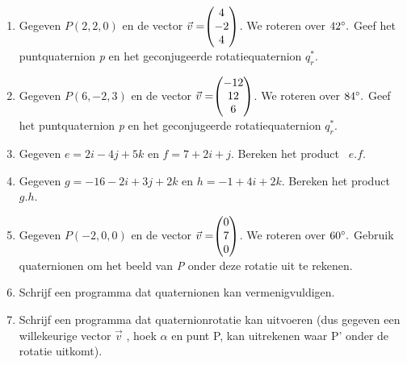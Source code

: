 \begin{enumerate}
	\item Gegeven $ P (2,2,0) $ en de vector $\vec{v} = \vecdrie{4}{-2}{4} $. 
	We roteren over $ 42\degree. $ Geef het puntquaternion \textit{p} en het geconjugeerde rotatiequaternion  $  q_r^* $. 
	
	\item Gegeven $ P (6,-2,3) $ en de vector $\vec{v} = \vecdrie{-12}{12}{6} $. 
	We roteren over $ 84\degree. $ Geef het puntquaternion \textit{p} en het geconjugeerde rotatiequaternion  $  q_r^* $. 
	
	\item Gegeven $ e = 2i-4j+5k$ en   $ f = 7+2i+j $. 
	Bereken het product \ $  e.f $.
	
	\item Gegeven $ g = -16 -2i+3j+2k $ en   $ h = -1+4i+2k $. 
	Bereken het product \ $  g.h $.
	
	\item  Gegeven $ P (-2, 0, 0) $ en de vector $\vec{v} = \vecdrie{0}{7}{0} $. 
	We roteren over $ 60\degree. $ Gebruik quaternionen om het beeld van \textit{P }onder deze rotatie uit te rekenen.   
	
	\item Schrijf een programma dat quaternionen kan vermenigvuldigen.   
	
	\item Schrijf een programma dat quaternionrotatie kan uitvoeren (dus gegeven een willekeurige vector $\vec{v} $ , hoek $ \alpha $ en punt P, kan uitrekenen waar P' onder de rotatie uitkomt).      
	
\end{enumerate}


